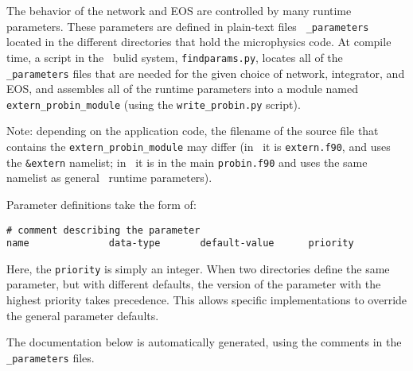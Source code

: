 \label{chapter:parameters}

The behavior of the network and EOS are controlled by many runtime
parameters.  These parameters are defined in plain-text files {\tt
  \_parameters} located in the different directories that hold the
microphysics code.  At compile time, a script in the \amrex\ bulid
system, {\tt findparams.py}, locates all of the {\tt \_parameters}
files that are needed for the given choice of network, integrator, and
EOS, and assembles all of the runtime parameters into a module named
{\tt extern\_probin\_module} (using the {\tt write\_probin.py}
script).  

Note: depending on the application code, the filename of the source 
file that contains the {\tt extern\_probin\_module} may differ
(in \castro\ it is {\tt extern.f90}, and uses the {\tt \&extern} namelist;
in \maestro\ it is in the main {\tt probin.f90} and uses the same namelist
as general \maestro\ runtime parameters).

Parameter definitions take the form of:
\begin{verbatim}
# comment describing the parameter
name              data-type       default-value      priority
\end{verbatim}
Here, the {\tt priority} is simply an integer.  When two directories
define the same parameter, but with different defaults, the version of
the parameter with the highest priority takes precedence.  This allows
specific implementations to override the general parameter defaults.

The documentation below is automatically generated, using the comments
in the {\tt \_parameters} files.
